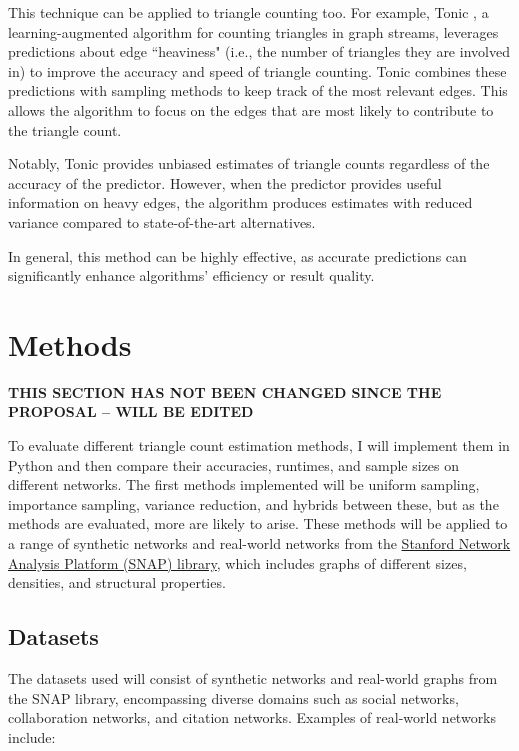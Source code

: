 \documentclass[11pt]{article}
\begin{document}
This technique can be applied to triangle counting too.
For example, Tonic \cite{boldrin_fast_2024}, a learning-augmented algorithm for counting triangles in graph streams, leverages predictions about edge ``heaviness" (i.e., the number of triangles they are involved in) to improve the accuracy and speed of triangle counting.
Tonic combines these predictions with sampling methods to keep track of the most relevant edges.
This allows the algorithm to focus on the edges that are most likely to contribute to the triangle count.

Notably, Tonic provides unbiased estimates of triangle counts regardless of the accuracy of the predictor.
However, when the predictor provides useful information on heavy edges, the algorithm produces estimates with reduced variance compared to state-of-the-art alternatives.

In general, this method can be highly effective, as accurate predictions can significantly enhance algorithms' efficiency or result quality.

\newpage

\section{Methods}

\textbf{THIS SECTION HAS NOT BEEN CHANGED SINCE THE PROPOSAL -- WILL BE EDITED}

To evaluate different triangle count estimation methods, I will implement them in Python and then compare their accuracies, runtimes, and sample sizes on different networks.
The first methods implemented will be uniform sampling, importance sampling, variance reduction, and hybrids between these, but as the methods are evaluated, more are likely to arise.
These methods will be applied to a range of synthetic networks and real-world networks from the \href{https://snap.stanford.edu/index.html}{Stanford Network Analysis Platform (SNAP) library}, which includes graphs of different sizes, densities, and structural properties.

\subsection{Datasets}

The datasets used will consist of synthetic networks and real-world graphs from the SNAP library, encompassing diverse domains such as social networks, collaboration networks, and citation networks.
Examples of real-world networks include:
\end{document}
